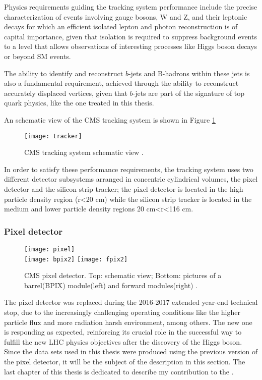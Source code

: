 Physics requirements guiding the tracking system performance include the precise characterization of events involving gauge bosons, W and Z, and their leptonic decays for which an efficient isolated lepton and photon reconstruction is of capital importance, given that isolation is required to suppress background events to a level that allows observations of interesting processes like Higgs boson decays or beyond SM events.

The ability to identify and reconstruct $b$-jets and B-hadrons within these jets is also a fundamental requirement, achieved through the ability to reconstruct accurately displaced vertices, given that $b$-jets are part of the signature of top quark physics, like the one treated in this thesis.

An schematic view of the CMS tracking system is shown in Figure \ref{fig:tracker} 

\begin{figure}[h!]
  \centering
  \texttt{[image: tracker]}
  \caption[CMS tracking system schematic view.]{CMS tracking system schematic view \cite{tracker}.}
  \label{fig:tracker}
\end{figure}

In order to satisfy these performance requirements, the tracking system uses two different detector subsystems arranged in concentric cylindrical volumes, the pixel detector and the silicon strip tracker; the pixel detector is located in the high particle density region (r<20 cm) while the silicon strip tracker is located in the medium and lower particle density regions 20 cm<r<116 cm.        

\subsubsection*{Pixel detector}


\begin{figure}[h!]
  \centering
  \texttt{[image: pixel]}\\
  \texttt{[image: bpix2]}
  \texttt{[image: fpix2]}
  \caption[CMS pixel detector]{CMS pixel detector. Top: schematic view; Bottom: pictures of a barrel(BPIX) module(left) and forward modules(right) \cite{cms}.}
  \label{fig:pixel_det}
\end{figure}

The pixel detector was replaced during the 2016-2017 extended year-end technical stop, due to the increasingly challenging operating conditions like the higher particle flux and more radiation harsh environment, among others. The new one is responding as expected, reinforcing its crucial role in the successful way to fulfill the new LHC physics objectives after the discovery of the Higgs boson. Since the data sets used in this thesis were produced using the previous version of the pixel detector, it will be the subject of the description in this section. The last chapter of this thesis is dedicated to describe my contribution to the .

